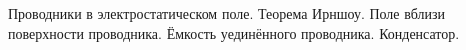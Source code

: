 \documentclass[__main__.tex]{subfiles}
\begin{document}
Проводники в электростатическом поле. Теорема Ирншоу. Поле вблизи поверхности проводника. Ёмкость уединённого проводника. Конденсатор.\\ 

\end{document}
